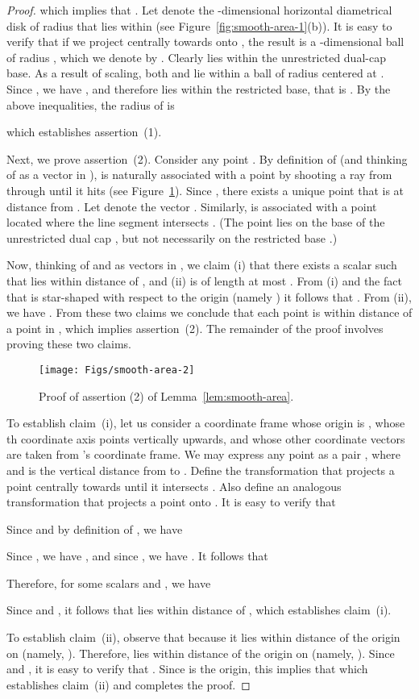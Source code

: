 \documentclass[11pt]{article}   \usepackage[letterpaper,hmargin=2.1cm,vmargin=3cm]{geometry}
\begin{document}
\begin{proof}
which implies that . Let  denote the -dimensional horizontal diametrical disk of radius  that lies within  (see Figure~\ref{fig:smooth-area-1}(b)). It is easy to verify that if we project  centrally towards  onto , the result is a -dimensional ball of radius , which we denote by . Clearly  lies within the unrestricted dual-cap base. As a result of scaling, both  and  lie within a ball of radius  centered at . Since , we have , and therefore  lies within the restricted base, that is . By the above inequalities, the radius of  is

which establishes assertion~(1).

Next, we prove assertion~(2). Consider any point . By definition of  (and thinking of  as a vector in ),  is naturally associated with a point  by shooting a ray from  through  until it hits  (see Figure~\ref{fig:smooth-area-2}). Since , there exists a unique point  that is at distance  from . Let  denote the vector . Similarly,  is associated with a point  located where the line segment  intersects . (The point  lies on the base of the unrestricted dual cap , but not necessarily on the restricted base .) 

Now, thinking of  and  as vectors in , we claim (i) that there exists a scalar  such that  lies within distance  of , and (ii)  is of length at most . From (i) and the fact that  is star-shaped with respect to the origin (namely ) it follows that . From (ii), we have . From these two claims we conclude that each point  is within distance  of a point in , which implies assertion~(2). The remainder of the proof involves proving these two claims.

\begin{figure}[htbp]
  \centerline{\texttt{[image: Figs/smooth-area-2]}}
  \caption{Proof of assertion (2) of Lemma~\ref{lem:smooth-area}.}
  \label{fig:smooth-area-2}
\end{figure}


To establish claim~(i), let us consider a coordinate frame whose origin is , whose th coordinate axis points vertically upwards, and whose other  coordinate vectors are taken from 's coordinate frame. We may express any point  as a pair , where  and  is the vertical distance from  to . Define the transformation  that projects a point  centrally towards  until it intersects . Also define an analogous transformation  that projects a point  onto . It is easy to verify that

Since  and by definition of , we have

Since , we have , and since , we have . It follows that 

Therefore, for some scalars  and , we have

Since  and , it follows that  lies within distance  of , which establishes claim~(i). 

To establish claim~(ii), observe that because  it lies within distance  of the origin on  (namely, ). Therefore,  lies within distance  of the origin on  (namely, ). Since  and , it is easy to verify that . Since  is the origin, this implies that  which establishes claim~(ii) and completes the proof.
\end{proof}
\end{document}
